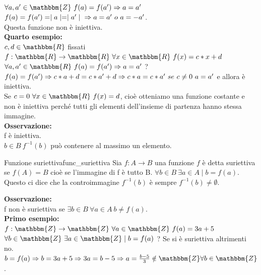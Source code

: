 \documentclass[12pt, letterpaper]{report}
\newcounter{definition}
\newcommand{\nmu}{}
\begin{document}
	\\
	$\forall a, a' \in \mathbbm{Z} \ f(a) = f(a') \Rightarrow a = a'$
	\\
	$f(a) = f(a') = \mid a \mid = \mid a' \mid \\ \Rightarrow a = a' \ o \ a = -a'$.
	\\
	Questa funzione non è iniettiva.
	\\
	\textbf{Quarto esempio: }
	\\
	$c,d \in \mathbbm{R}$ fissati
	\\
	$f: \mathbbm{R} \to \mathbbm{R} \ \forall x \in \mathbbm{R} \ f(x) = c * x + d$
	\\
	$\forall a, a' \in \mathbbm{R} \ f(a) = f(a') \Rightarrow a = a'$ ?
	\\
	$f(a) = f(a') \\ \Rightarrow c * a + d = c * a' + d \\ \Rightarrow c * a = c * a' \ se \ c \neq 0 \ a = a'$ e allora è iniettiva.
	\\
	Se $c = 0 \ \forall x \in \mathbbm{R} \ f(x) = d$, cioè otteniamo una funzione costante e non è iniettiva perché tutti gli elementi dell'insieme di partenza hanno stessa immagine.
	\\
	\textbf{Osservazione: }
	\\
	f è iniettiva.
	\\
	$b \in B \ f^{-1}(b)$ può contenere al massimo un elemento.
	\begin{definition}{\nmu Funzione suriettiva}{func_suriettiva}
		Sia $f: A \to B$ una funzione $f$ è detta suriettiva se $f(A) = B$ cioè se l'immagine di f è tutto B.
		$\forall b \in B \  \exists a \in A \mid b = f(a)$.
		Questo ci dice che la controimmagine $f^{-1}(b)$ è sempre $f^{-1}(b) \neq \emptyset$.
	\end{definition}
	\textbf{Osservazione: }
	\\
	f non è suriettiva se $\exists b \in B \ \forall a \in A \ b \neq f(a)$.
	\\
	\textbf{Primo esempio: }
	\\
	$f: \mathbbm{Z} \to \mathbbm{Z} \ \forall a \in \mathbbm{Z} \ f(a) = 3a + 5$
	\\
	$\forall b \in \mathbbm{Z} \ \exists a \in \mathbbm{Z} \mid b = f(a)$ ? Se si è suriettiva altrimenti no.
	\\
	$b = f(a) \\ \Rightarrow b = 3a + 5 \\ \Rightarrow 3a = b - 5 \\ \Rightarrow a = \frac{b - 5}{3} \notin \mathbbm{Z} \forall b \in \mathbbm{Z}$.
\end{document}
